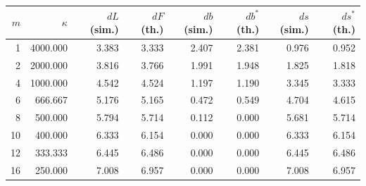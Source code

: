 \begin{tabular}{rrrrrrrr}
\toprule
$m$ & $\kappa$ & $dL$ (sim.) & $dF$ (th.) & $db$ (sim.) & $db^\ast$ (th.) & $ds$ (sim.) & $ds^\ast$ (th.) \\
\midrule
1 & 4000.000 & 3.383 & 3.333 & 2.407 & 2.381 & 0.976 & 0.952 \\
2 & 2000.000 & 3.816 & 3.766 & 1.991 & 1.948 & 1.825 & 1.818 \\
4 & 1000.000 & 4.542 & 4.524 & 1.197 & 1.190 & 3.345 & 3.333 \\
6 & 666.667 & 5.176 & 5.165 & 0.472 & 0.549 & 4.704 & 4.615 \\
8 & 500.000 & 5.794 & 5.714 & 0.112 & 0.000 & 5.681 & 5.714 \\
10 & 400.000 & 6.333 & 6.154 & 0.000 & 0.000 & 6.333 & 6.154 \\
12 & 333.333 & 6.445 & 6.486 & 0.000 & 0.000 & 6.445 & 6.486 \\
16 & 250.000 & 7.008 & 6.957 & 0.000 & 0.000 & 7.008 & 6.957 \\
\bottomrule
\end{tabular}
